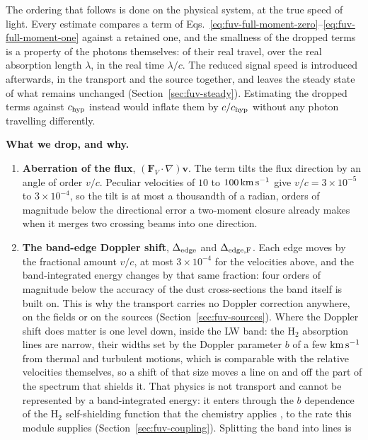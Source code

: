 The ordering that follows is done on the physical system, at the true speed
of light. Every estimate compares a term of
Eqs.~\ref{eq:fuv-full-moment-zero}--\ref{eq:fuv-full-moment-one} against a
retained one, and the smallness of the dropped terms is a property of the
photons themselves: of their real travel, over the real absorption length
$\lambda$, in the real time $\lambda/c$. The reduced signal speed is
introduced afterwards, in the transport and the source together, and leaves
the steady state of what remains unchanged (Section~\ref{sec:fuv-steady}).
Estimating the dropped terms against $c_{\rm hyp}$ instead would inflate
them by $c/c_{\rm hyp}$ without any photon travelling differently.

\textbf{What we drop, and why.}
\begin{enumerate}
  \item \textbf{Aberration of the flux}, $(\mathbf F_V\cdot\nabla)\mathbf
    v$. The term tilts the flux direction by an angle of order $v/c$.
    Peculiar velocities of $10$ to $100\,{\rm km\,s^{-1}}$ give $v/c =
    3\times10^{-5}$ to $3\times10^{-4}$, so the tilt is at most a
    thousandth of a radian, orders of magnitude below the directional
    error a two-moment closure already makes when it merges two crossing
    beams into one direction.
  \item \textbf{The band-edge Doppler shift}, $\Delta_{\rm edge}$ and
    $\Delta_{\rm edge,F}$. Each edge moves by the fractional amount
    $v/c$, at most $3\times10^{-4}$ for the velocities above, and the
    band-integrated energy changes by that same fraction: four orders of
    magnitude below the accuracy of the dust cross-sections the band
    itself is built on. This is why the transport carries no Doppler
    correction anywhere, on the fields or on the sources
    (Section~\ref{sec:fuv-sources}). Where the Doppler shift does matter
    is one level down, inside the LW band: the H$_2$ absorption lines are
    narrow, their widths set by the Doppler parameter $b$ of a few
    ${\rm km\,s^{-1}}$ from thermal and turbulent motions, which is
    comparable with the relative velocities themselves, so a shift of
    that size moves a line on and off the part of the spectrum that
    shields it. That physics is not transport and cannot be represented
    by a band-integrated energy: it enters through the $b$ dependence of
    the H$_2$ self-shielding function that the chemistry applies
    \citep{WolcottGreenHaiman2019}, to the rate this module supplies
    (Section~\ref{sec:fuv-coupling}). Splitting the band into lines is

\end{enumerate}
